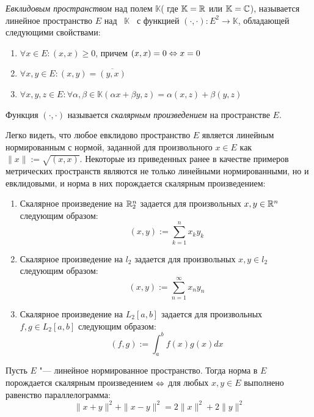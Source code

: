 \begin{definition}
	\textit{Евклидовым пространством} над полем $\mathbb{K}$( где $\mathbb{K} = \mathbb{R}$ или $\mathbb{K} = \mathbb{C}$), называется линейное пространство $E$ над \ $\mathbb{K}$ \ с функцией $(\cdot, \cdot) : E^2 \to \mathbb{K}$, обладающей следующими свойствами:
	\begin{enumerate}
		\item $\forall x \in E: (x, x) \geqslant 0$, причем $(x, x) = 0 \Leftrightarrow x = 0$
		\item $\forall x, y \in E: (x, y) = \overline{(y, x)}$
		\item $\forall x, y, z \in E: \forall \alpha, \beta \in \mathbb{K} (\alpha x + \beta y, z) = \alpha(x, z) + \beta(y, z)$
	\end{enumerate}

	Функция $(\cdot, \cdot)$ называется \textit{скалярным произведением} на пространстве $E$.
\end{definition}

\begin{example}
	Легко видеть, что любое евклидово пространство $E$ является линейным нормированным с нормой, заданной для произвольного $x \in E$ как $\|x\| := \sqrt{(x, x)}$. Некоторые из приведенных ранее в качестве примеров метрических пространств являются не только линейными нормированными, но и евклидовыми, и норма в них порождается скалярным произведением:
	\begin{enumerate}
		\item Скалярное произведение на $\mathbb{R}^n_2$ задается для произвольных $x, y \in \mathbb{R}^n$ следующим образом:
  		\[(x, y) := \sum_{k = 1}^n x_ky_k\]

		\item Скалярное произведение на $l_2$ задается для произвольных $x, y \in l_2$ следующим образом:
		\[(x, y) := \sum_{n = 1}^\infty x_ny_n\]

		\item Скалярное произведение на $L_2[a, b]$ задается для произвольных $f, g \in L_2[a, b]$ следующим образом:
		\[(f, g) := \int_a^b f(x)g(x)dx\]
	\end{enumerate}
\end{example}

\begin{theorem}
	Пусть $E$ "--- линейное нормированное пространство. Тогда норма в $E$ порождается скалярным произведением $\Leftrightarrow$ для любых $x, y \in E$ выполнено равенство параллелограмма:
	\[\|x+y\|^2 + \|x-y\|^2 = 2\|x\|^2 + 2\|y\|^2\]
\end{theorem}

